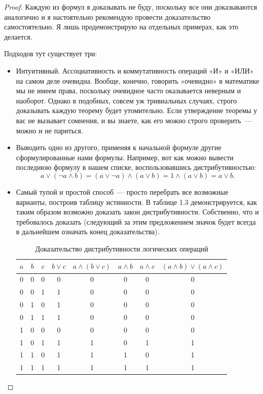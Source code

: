 \begin{proof}
Каждую из формул я доказывать не буду, поскольку все они доказываются аналогично и я настоятельно рекомендую провести доказательство самостоятельно. Я лишь продемонстрирую на отдельных примерах, как это делается.

Подходов тут существует три:
\begin{itemize}
\item Интуитивный. Ассоциативность и коммутативность операций «И» и «ИЛИ» на самом деле очевидна. Вообще, конечно, говорить «очевидно» в математике мы не имеем права, поскольку очевидное часто оказывается неверным и наоборот. Однако в подобных, совсем уж тривиальных случаях, строго доказывать каждую теорему будет утомительно. Если утверждение теоремы у вас не вызывает сомнения, и вы знаете, как его можно строго проверить~— можно и не париться.
\item Выводить одно из другого, применяя к начальной формуле другие сформулированные нами формулы. Например, вот как можно вывести последнюю формулу в нашем списке, воспользовавшись дистрибутивностью:
$$
a \lor (\neg a \land b) = (a \lor \neg a) \land (a \lor b) = 1 \land (a \lor b) = a \lor b.
$$

\item Самый тупой и простой способ~— просто перебрать все возможные варианты, построив таблицу истинности. В таблице 1.3 демонстрируется, как таким образом возможно доказать закон дистрибутивности. Собственно, что и требовалось доказать (следующий за этим предложением значок будет всегда в дальнейшем означать конец доказательства).

\begin{table}[h]
\centering
\begin{tabular}{ccc|cc|ccc}
$a$&$b$&$c$&$b\lor c$&$a\land(b\lor c)$&$a\land b$&$a\land c$&$(a\land b)\lor(a\land c)$\\
\hline
0&0&0&0&0&0&0&0\\
0&0&1&1&0&0&0&0\\
0&1&0&1&0&0&0&0\\
0&1&1&1&0&0&0&0\\
1&0&0&0&0&0&0&0\\
1&0&1&1&1&0&1&1\\
1&1&0&1&1&1&0&1\\
1&1&1&1&1&1&1&1
\end{tabular}
\caption{Доказательство дистрибутивности логических операций}
\end{table}

\end{itemize}
\end{proof}

